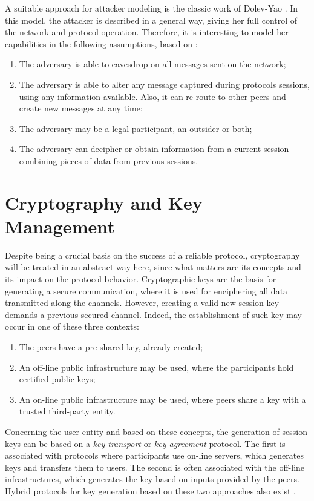 A suitable approach for attacker modeling is the classic work of Dolev-Yao \cite{DolevYao81}. In this model, the attacker is described in a general way, giving her full control of the network and protocol operation. Therefore, it is interesting to model her capabilities in the following assumptions, based on \cite{BoydMathuria2008}:

\begin{enumerate}
  \item The adversary is able to eavesdrop on all messages sent on the network;
  \item The adversary is able to alter any message captured during protocols sessions, using any information available. Also, it can re-route to other peers and create new messages at any time;
  \item The adversary may be a legal participant, an outsider or both;
  \item The adversary can decipher or obtain information from a current session combining pieces of data from previous sessions.
\end{enumerate}





\section{Cryptography and Key Management}
Despite being a crucial basis on the success of a reliable protocol, cryptography will be treated in an abstract way here, since what matters are its concepts and its impact on the protocol behavior. Cryptographic keys are the basis for generating a secure communication, where it is used for enciphering all data transmitted along the channels. However, creating a valid new session key demands a previous secured channel. Indeed, the establishment of such key may occur in one of these three contexts:

\begin{enumerate}
  \item The peers have a pre-shared key, already created;
  \item An off-line public infrastructure may be used, where the participants hold certified public keys;
  \item An on-line public infrastructure may be used, where peers share a key with a trusted third-party entity.
\end{enumerate}

Concerning the user entity and based on these concepts, the generation of session keys can be based on a \textit{key transport} or \textit{key agreement} protocol. The first is associated with protocols where participants use on-line servers, which generates keys and transfers them to users. The second is often associated with the off-line infrastructures, which generates the key based on inputs provided by the peers. Hybrid protocols for key generation based on these two approaches also exist \cite{BoydMathuria2008}.





